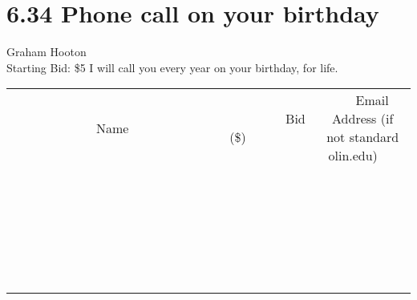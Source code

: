 \documentclass[11pt]{article}
\begin{document}
\section*{6.34 Phone call on your birthday}
Graham Hooton
\\
Starting Bid: \$5
\newline
I will call you every year on your birthday, for life.
\\[6ex]
\begin{tabular}{c c c}
~~~~~~~~~~~~~Name~~~~~~~~~~~~~ & ~~~~~~~~~Bid (\$)~~~~~~~~~  & ~~~Email Address (if not standard olin.edu)~~~\\
 & & \\
\hline
 & & \\
\hline
 & & \\
\hline
 & & \\
\hline
 & & \\
\hline
 & & \\
\hline
 & & \\
\hline
 & & \\
\hline
 & & \\
\hline
 & & \\
\hline
 & & \\
\hline
 & & \\
\hline
 & & \\
\hline
 & & \\
\hline
 & & \\
\hline
 & & \\
\hline
 & & \\
\hline
 & & \\
\hline
 & & \\
\hline
 & & \\
\hline
 & & \\
\hline
 & & \\
\hline
 & & \\
\hline
 & & \\
\hline
 & & \\
\hline
 & & \\
\hline
\end{tabular}
\newpage
\end{document}
